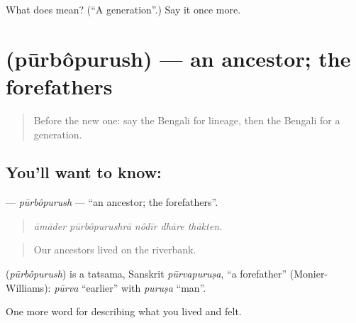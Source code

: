 \begin{tcolorbox}[breakable,colback=teal!4,colframe=teal!35!black,title={Before you move on}]
What does  mean? (\textquotedblleft{}A generation\textquotedblright{}.) Say it once more.
\end{tcolorbox}
\section[\texorpdfstring{\bn{পূর্বপুরুষ} (pūrbôpurush)}{পূর্বপুরুষ (pūrbôpurush)}]{ (pūrbôpurush) — an ancestor; the forefathers}

\label{lesson:BN-C484-purbopurush}



\begin{quote}
Before the new one: say the Bengali for lineage, then the Bengali for a generation.
\end{quote}

\subsection*{You'll want to know: }
\textbf{} — \emph{pūrbôpurush} — \textquotedblleft{}an ancestor; the forefathers\textquotedblright{}.

\begin{quote}
    
\end{quote}

\begin{quote}
\emph{āmāder pūrbôpurushrā nôdīr dhāre thākten.}
\end{quote}

\begin{quote}
Our ancestors lived on the riverbank.
\end{quote}

\begin{cousinweb}
\textbf{} (\emph{pūrbôpurush}) is a tatsama, Sanskrit \emph{pūrvapuruṣa}, \textquotedblleft{}a forefather\textquotedblright{} (Monier-Williams): \emph{pūrva} \textquotedblleft{}earlier\textquotedblright{} with \emph{puruṣa} \textquotedblleft{}man\textquotedblright{}.
\end{cousinweb}

\begin{grammarlens}[title={What you've built}]
One more word for describing what you lived and felt.
\end{grammarlens}

